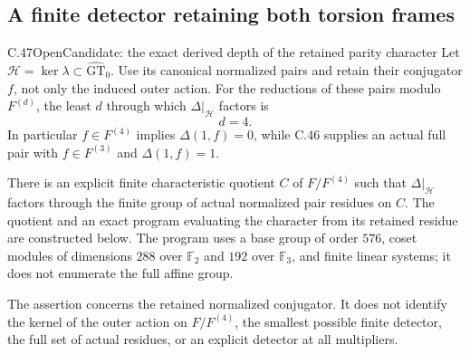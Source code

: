 \subsection{A finite detector retaining both torsion frames}

\begin{statement}{C.47}{Open}{Candidate: the exact derived depth of the retained parity character}
Let $\mathcal H=\ker\lambda\subset\widehat{\mathrm{GT}}_0$.
Use its canonical normalized pairs and retain their conjugator $f$,
not only the induced outer action. For the reductions of these pairs
modulo $F^{(d)}$, the least $d$ through which $\Delta|_{\mathcal H}$
factors is
\[
                              d=4.                    \tag{C.47.1}
\]
In particular $f\in F^{(4)}$ implies $\Delta(1,f)=0$, while
C.46 supplies an actual full pair with $f\in F^{(3)}$ and
$\Delta(1,f)=1$.

There is an explicit finite characteristic quotient $C$ of
$F/F^{(4)}$ such that $\Delta|_{\mathcal H}$ factors through
the finite group of actual normalized pair residues on $C$.
The quotient and an exact program evaluating the character from
its retained residue are constructed below. The program uses a
base group of order $576$, coset modules of dimensions $288$ over
$\mathbb F_2$ and $192$ over $\mathbb F_3$, and finite linear
systems; it does not enumerate the full affine group.

The assertion concerns the retained normalized conjugator.
It does not identify the kernel of the outer action on
$F/F^{(4)}$, the smallest possible finite detector, the full
set of actual residues, or an explicit detector at all multipliers.
\end{statement}

